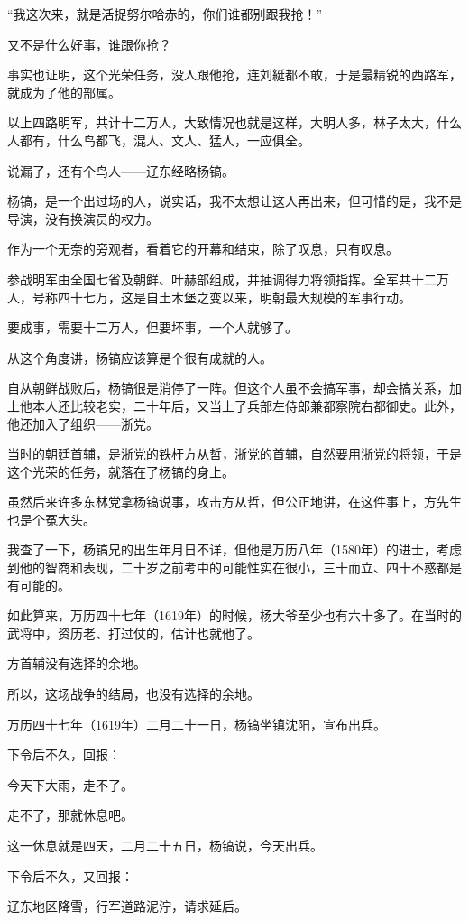 \begin{multicols}{\theparacolNo}
		“我这次来，就是活捉努尔哈赤的，你们谁都别跟我抢！”

		又不是什么好事，谁跟你抢？

		事实也证明，这个光荣任务，没人跟他抢，连刘綎都不敢，于是最精锐的西路军，就成为了他的部属。

		以上四路明军，共计十二万人，大致情况也就是这样，大明人多，林子太大，什么人都有，什么鸟都飞，混人、文人、猛人，一应俱全。

		说漏了，还有个鸟人——辽东经略杨镐。

		杨镐，是一个出过场的人，说实话，我不太想让这人再出来，但可惜的是，我不是导演，没有换演员的权力。

		作为一个无奈的旁观者，看着它的开幕和结束，除了叹息，只有叹息。

		参战明军由全国七省及朝鲜、叶赫部组成，并抽调得力将领指挥。全军共十二万人，号称四十七万，这是自土木堡之变以来，明朝最大规模的军事行动。

		要成事，需要十二万人，但要坏事，一个人就够了。

		从这个角度讲，杨镐应该算是个很有成就的人。

		自从朝鲜战败后，杨镐很是消停了一阵。但这个人虽不会搞军事，却会搞关系，加上他本人还比较老实，二十年后，又当上了兵部左侍郎兼都察院右都御史。此外，他还加入了组织——浙党。

		当时的朝廷首辅，是浙党的铁杆方从哲，浙党的首辅，自然要用浙党的将领，于是这个光荣的任务，就落在了杨镐的身上。

		虽然后来许多东林党拿杨镐说事，攻击方从哲，但公正地讲，在这件事上，方先生也是个冤大头。

		我查了一下，杨镐兄的出生年月日不详，但他是万历八年（1580年）的进士，考虑到他的智商和表现，二十岁之前考中的可能性实在很小，三十而立、四十不惑都是有可能的。

		如此算来，万历四十七年（1619年）的时候，杨大爷至少也有六十多了。在当时的武将中，资历老、打过仗的，估计也就他了。

		方首辅没有选择的余地。

		所以，这场战争的结局，也没有选择的余地。

		万历四十七年（1619年）二月二十一日，杨镐坐镇沈阳，宣布出兵。

		下令后不久，回报：

		今天下大雨，走不了。

		走不了，那就休息吧。

		这一休息就是四天，二月二十五日，杨镐说，今天出兵。

		下令后不久，又回报：

		辽东地区降雪，行军道路泥泞，请求延后。


\end{multicols}

